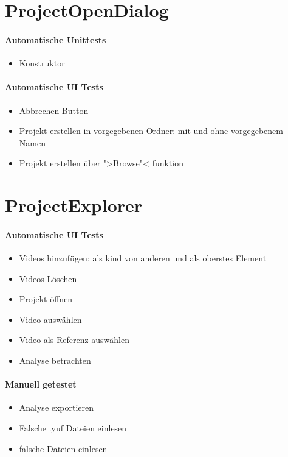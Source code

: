 \section{ProjectOpenDialog}
\paragraph{Automatische Unittests}
\begin{itemize}
\item Konstruktor
\end{itemize}
\paragraph{Automatische UI Tests}
\begin{itemize}
\item Abbrechen Button
\item Projekt erstellen in vorgegebenen Ordner: mit und ohne vorgegebenem Namen
\item Projekt erstellen über ">Browse"< funktion
\end{itemize}
\section{ProjectExplorer}
\paragraph{Automatische UI Tests}
\begin{itemize}
\item Videos hinzufügen: als kind von anderen und als oberstes Element
\item Videos Löschen
\item Projekt öffnen
\item Video auswählen
\item Video als Referenz auswählen
\item Analyse betrachten 
\end{itemize}
\paragraph{Manuell getestet}
\begin{itemize}
\item Analyse exportieren
\item Falsche .yuf Dateien einlesen
\item falsche Dateien einlesen
\end{itemize}

